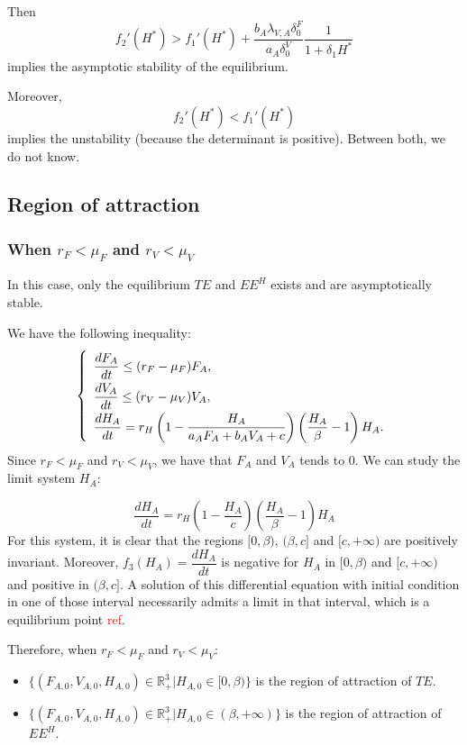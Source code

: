 \documentclass{article}
\newcommand{\lva}{\lambda_{V, A}}
\newcommand{\df}{\delta_0^F}
\newcommand{\dv}{\delta_0^V}
\newcommand{\marc}[1]{\textcolor{red}{#1}}
\begin{document}
Then
$$
f_2'(H^*) > f_1'(H^*) + \dfrac{b_A \lva \df}{a_A \dv} \dfrac{1}{1+\delta_1 H^*}
$$
implies the asymptotic stability of the equilibrium.

Moreover, 
$$
f_2'(H^*) < f_1'(H^*)
$$
implies the unstability (because the determinant is positive). Between both, we do not know.

\subsection{Region of attraction}
\subsubsection{When $r_F < \mu_F$ and $r_V < \mu_V$}
In this case, only the equilibrium $TE$ and $EE^{H}$ exists and are asymptotically stable.

We have the following inequality:
\begin{equation}
\left\{ \def\arraystretch{2}
\begin{array}{l}
\dfrac{dF_{A}}{dt} \leq (r_F -\mu_{F})F_A,\\
\dfrac{dV_{A}}{dt} \leq (r_V -\mu_{V})V_A,\\
\dfrac{dH_A}{dt} = r_{H}\left(1-\dfrac{H_A}{a_{A}F_{A} + b_A V_A +c}\right)\left(\dfrac{H_A}{\beta}-1\right)H_A. \\
\end{array}\right.
\end{equation}
Since $r_F < \mu_{F}$ and $r_V < \mu_{V}$, we have that $F_A$ and $V_A$ tends to 0. We can study the limit system $H_A$:

$$
\dfrac{dH_A}{dt} = r_{H}\left(1-\dfrac{H_A}{c}\right)\left(\dfrac{H_A}{\beta}-1\right)H_A
$$
For this system, it is clear that the regions $[0, \beta)$, $(\beta, c]$ and $[c, + \infty)$ are positively invariant. Moreover, $f_3(H_A) = \dfrac{dH_A}{dt}$ is negative for $H_A$ in $[0, \beta)$ and $[c, + \infty)$ and positive in $(\beta, c]$. A solution of this differential equation with initial condition in one of those interval necessarily admits a limit in that interval, which is a equilibrium point \marc{ref}.

Therefore, when $r_F < \mu_{F}$ and $r_V < \mu_{V}$:
\begin{itemize}
\item $\{(F_{A,0}, V_{A, 0}, H_{A, 0}) \in \mathbb{R}_+^3 | H_{A, 0} \in [0, \beta) \}$ is the region of attraction of $TE$.
\item $\{(F_{A,0}, V_{A, 0}, H_{A, 0}) \in \mathbb{R}_+^3 | H_{A, 0} \in (\beta, +\infty) \}$ is the region of attraction of $EE^{H}$.
\end{itemize}
\end{document}
